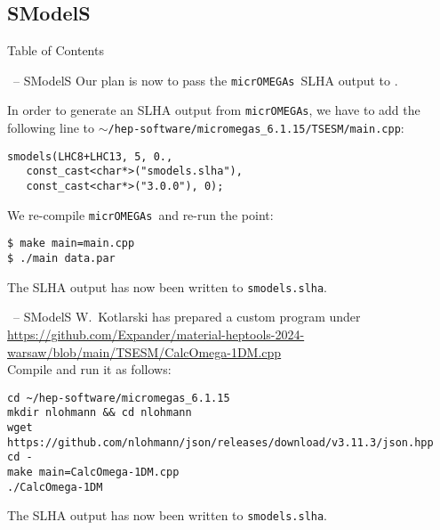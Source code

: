 \documentclass[11pt]{beamer}
\newcommand{\micrOMEGAs}{\texttt{micrOMEGAs}}
\newcommand{\SModelS}{\text{SModelS}}
\begin{document}

\subsection{SModelS}


\begin{frame}{Table of Contents}
\end{frame}


\begin{frame}[fragile]{\insertsection\ -- SModelS}
  Our plan is now to pass the \micrOMEGAs\ SLHA output to \SModelS.

  \bigskip

  In order to generate an SLHA output from \micrOMEGAs, we have to
  add the following line to
  \texttt{$\sim$/hep-software/micromegas\_6.1.15/TSESM/main.cpp}:
  \begin{lstlisting}
smodels(LHC8+LHC13, 5, 0.,
   const_cast<char*>("smodels.slha"),
   const_cast<char*>("3.0.0"), 0);\end{lstlisting}%
  We re-compile \micrOMEGAs\ and re-run the point:
  \begin{lstlisting}
$ make main=main.cpp
$ ./main data.par\end{lstlisting}%
  The SLHA output has now been written to \texttt{smodels.slha}.
\end{frame}


\begin{frame}[fragile]{\insertsection\ -- SModelS}
  W.\ Kotlarski has prepared a custom program under\\
  {\small\url{https://github.com/Expander/material-heptools-2024-warsaw/blob/main/TSESM/CalcOmega-1DM.cpp}}\\
  Compile and run it as follows:
  \begin{lstlisting}
cd ~/hep-software/micromegas_6.1.15
mkdir nlohmann && cd nlohmann
wget https://github.com/nlohmann/json/releases/download/v3.11.3/json.hpp
cd -
make main=CalcOmega-1DM.cpp
./CalcOmega-1DM\end{lstlisting}%
  The SLHA output has now been written to \texttt{smodels.slha}.
\end{frame}
\end{document}
